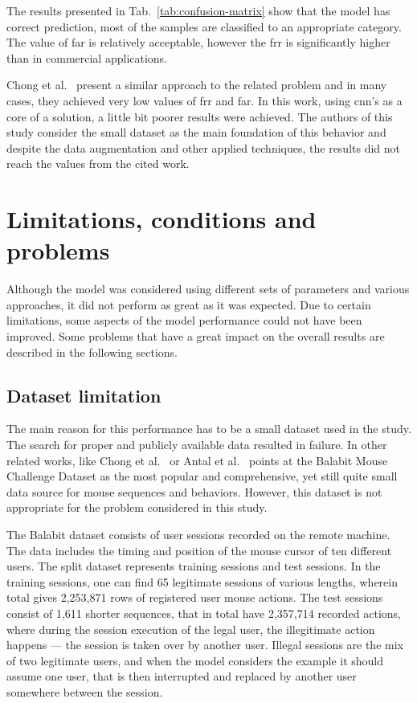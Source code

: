The results presented in \mbox{Tab.~\ref{tab:confusion-matrix}} show that the model has correct prediction, most of the samples are classified to an appropriate category.
The value of \gls{far} is relatively acceptable, however the \gls{frr} is significantly higher than in commercial applications.

Chong et al.~\cite{Main} present a similar approach to the related problem and in many cases, they achieved very low values of \gls{frr} and \gls{far}.
In this work, using \gls{cnn}'s as a core of a solution, a little bit poorer results were achieved.
The authors of this study consider the small dataset as the main foundation of this behavior and despite the data augmentation and other applied techniques, the results did not reach the values from the cited work.

\section{Limitations, conditions and problems}\label{sec:limitations-conditions-problems}
Although the model was considered using different sets of parameters and various approaches, it did not perform as great as it was expected.
Due to certain limitations, some aspects of the model performance could not have been improved.
Some problems that have a great impact on the overall results are described in the following sections.

\subsection{Dataset limitation}\label{subsec:dataset-limitation}
The main reason for this performance has to be a small dataset used in the study.
The search for proper and publicly available data resulted in failure.
In other related works, like Chong et al.~\cite{Main} or Antal et al.~\cite{antal2019intrusion} points at the Balabit Mouse Challenge Dataset as the most popular and comprehensive, yet still quite small data source for mouse sequences and behaviors.
However, this dataset is not appropriate for the problem considered in this study.

The Balabit dataset consists of user sessions recorded on the remote machine.
The data includes the timing and position of the mouse cursor of ten different users.
The split dataset represents training sessions and test sessions.
In the training sessions, one can find 65 legitimate sessions of various lengths, wherein total gives 2,253,871 rows of registered user mouse actions.
The test sessions consist of 1,611 shorter sequences, that in total have 2,357,714 recorded actions, where during the session execution of the legal user, the illegitimate action happens --- the session is taken over by another user.
Illegal sessions are the mix of two legitimate users, and when the model considers the example it should assume one user, that is then interrupted and replaced by another user somewhere between the session.


